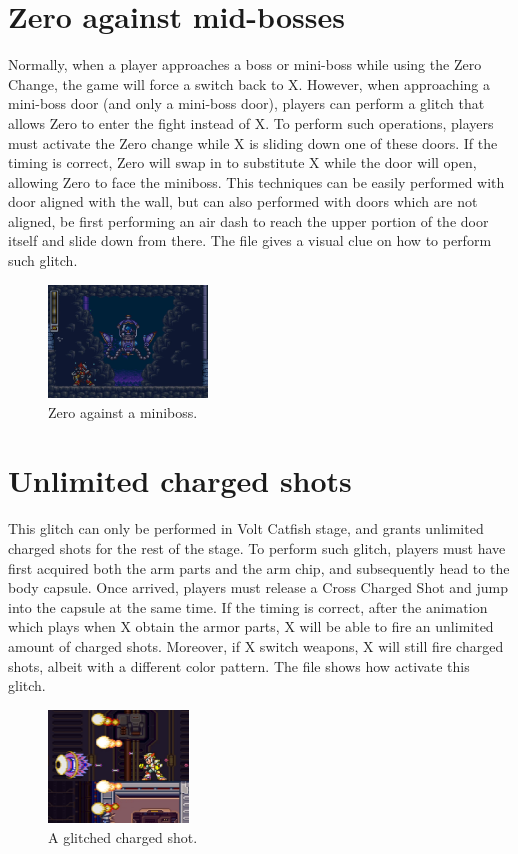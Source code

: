 \section{Zero against mid-bosses}
Normally, when a player approaches a boss or mini-boss while using the Zero Change, the game will force a switch back to X. However, when approaching a mini-boss door (and only a mini-boss door), players can perform a glitch that allows Zero to enter the fight instead of X. To perform such operations, players must activate the Zero change while X is sliding down one of these doors. If the timing is correct, Zero will swap in to substitute X while the door will open, allowing Zero to face the miniboss. This techniques can be easily performed with door aligned with the wall, but can also performed with doors which are not aligned, be first performing an air dash to reach the upper portion of the door itself and slide down from there. The file  gives a visual clue on how to perform such glitch.
\begin{figure}[htp]
	\centering
	\includegraphics[height=3cm]{figures/X3/Zero_minib.png}
	\caption{Zero against a miniboss.}
\end{figure}

\section{Unlimited charged shots}
This glitch can only be performed in Volt Catfish stage, and grants unlimited charged shots for the rest of the stage. To perform such glitch, players must have first acquired both the arm parts and the arm chip, and subsequently head to the body capsule. Once arrived, players must release a Cross Charged Shot and jump into the capsule at the same time. If the timing is correct, after the animation which plays when X obtain the armor parts, X will be able to fire an unlimited amount of charged shots. Moreover, if X switch weapons, X will still fire charged shots, albeit with a different color pattern. The file  shows how activate this glitch.
\begin{figure}[htp]
	\centering
	\includegraphics[height=3cm]{figures/X3/glitched_shot.png}
	\caption{A glitched charged shot.}
\end{figure}

